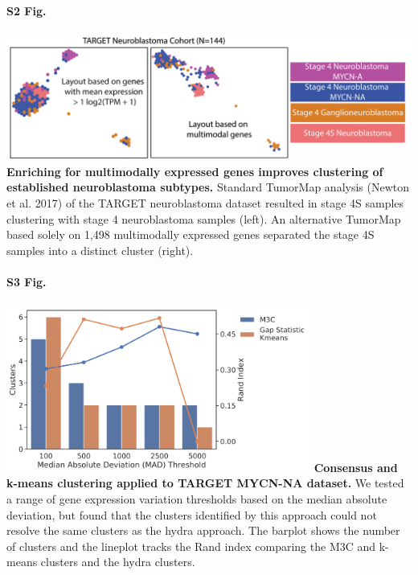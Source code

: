 \documentclass[10pt,letterpaper]{article}
\begin{document}
\paragraph*{S2 Fig.}
\includegraphics[width=\textwidth]{img/PNG/TumorMap-NBL-MM-V3-2x}
\label{S2_Fig}
{\bf Enriching for multimodally expressed genes improves clustering of established neuroblastoma subtypes.} Standard TumorMap analysis (Newton et al. 2017) of the TARGET neuroblastoma dataset resulted in stage 4S samples clustering with stage 4 neuroblastoma samples (left). An alternative TumorMap based solely on 1,498 multimodally expressed genes separated the stage 4S samples into a distinct cluster (right).

\paragraph*{S3 Fig.}
\includegraphics[width=0.75\textwidth]{img/PNG/clustering-screen}
\label{S3_Fig}
{\bf{Consensus and k-means clustering applied to TARGET MYCN-NA dataset.}} We tested a range of gene expression variation thresholds based on the median absolute deviation, but found that the clusters identified by this approach could not resolve the same clusters as the hydra approach. The barplot shows the number of clusters and the lineplot tracks the Rand index comparing the M3C and k-means clusters and the hydra clusters.





\end{document}
